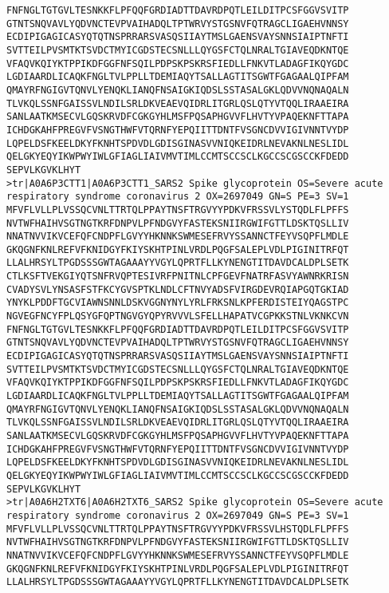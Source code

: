 \documentclass[en,black,12pt,normal]{elegantnote}
\begin{document}
\begin{lstlisting}
FNFNGLTGTGVLTESNKKFLPFQQFGRDIADTTDAVRDPQTLEILDITPCSFGGVSVITP
GTNTSNQVAVLYQDVNCTEVPVAIHADQLTPTWRVYSTGSNVFQTRAGCLIGAEHVNNSY
ECDIPIGAGICASYQTQTNSPRRARSVASQSIIAYTMSLGAENSVAYSNNSIAIPTNFTI
SVTTEILPVSMTKTSVDCTMYICGDSTECSNLLLQYGSFCTQLNRALTGIAVEQDKNTQE
VFAQVKQIYKTPPIKDFGGFNFSQILPDPSKPSKRSFIEDLLFNKVTLADAGFIKQYGDC
LGDIAARDLICAQKFNGLTVLPPLLTDEMIAQYTSALLAGTITSGWTFGAGAALQIPFAM
QMAYRFNGIGVTQNVLYENQKLIANQFNSAIGKIQDSLSSTASALGKLQDVVNQNAQALN
TLVKQLSSNFGAISSVLNDILSRLDKVEAEVQIDRLITGRLQSLQTYVTQQLIRAAEIRA
SANLAATKMSECVLGQSKRVDFCGKGYHLMSFPQSAPHGVVFLHVTYVPAQEKNFTTAPA
ICHDGKAHFPREGVFVSNGTHWFVTQRNFYEPQIITTDNTFVSGNCDVVIGIVNNTVYDP
LQPELDSFKEELDKYFKNHTSPDVDLGDISGINASVVNIQKEIDRLNEVAKNLNESLIDL
QELGKYEQYIKWPWYIWLGFIAGLIAIVMVTIMLCCMTSCCSCLKGCCSCGSCCKFDEDD
SEPVLKGVKLHYT
>tr|A0A6P3CTT1|A0A6P3CTT1_SARS2 Spike glycoprotein OS=Severe acute respiratory syndrome coronavirus 2 OX=2697049 GN=S PE=3 SV=1
MFVFLVLLPLVSSQCVNLTTRTQLPPAYTNSFTRGVYYPDKVFRSSVLYSTQDLFLPFFS
NVTWFHAIHVSGTNGTKRFDNPVLPFNDGVYFASTEKSNIIRGWIFGTTLDSKTQSLLIV
NNATNVVIKVCEFQFCNDPFLGVYYHKNNKSWMESEFRVYSSANNCTFEYVSQPFLMDLE
GKQGNFKNLREFVFKNIDGYFKIYSKHTPINLVRDLPQGFSALEPLVDLPIGINITRFQT
LLALHRSYLTPGDSSSGWTAGAAAYYVGYLQPRTFLLKYNENGTITDAVDCALDPLSETK
CTLKSFTVEKGIYQTSNFRVQPTESIVRFPNITNLCPFGEVFNATRFASVYAWNRKRISN
CVADYSVLYNSASFSTFKCYGVSPTKLNDLCFTNVYADSFVIRGDEVRQIAPGQTGKIAD
YNYKLPDDFTGCVIAWNSNNLDSKVGGNYNYLYRLFRKSNLKPFERDISTEIYQAGSTPC
NGVEGFNCYFPLQSYGFQPTNGVGYQPYRVVVLSFELLHAPATVCGPKKSTNLVKNKCVN
FNFNGLTGTGVLTESNKKFLPFQQFGRDIADTTDAVRDPQTLEILDITPCSFGGVSVITP
GTNTSNQVAVLYQDVNCTEVPVAIHADQLTPTWRVYSTGSNVFQTRAGCLIGAEHVNNSY
ECDIPIGAGICASYQTQTNSPRRARSVASQSIIAYTMSLGAENSVAYSNNSIAIPTNFTI
SVTTEILPVSMTKTSVDCTMYICGDSTECSNLLLQYGSFCTQLNRALTGIAVEQDKNTQE
VFAQVKQIYKTPPIKDFGGFNFSQILPDPSKPSKRSFIEDLLFNKVTLADAGFIKQYGDC
LGDIAARDLICAQKFNGLTVLPPLLTDEMIAQYTSALLAGTITSGWTFGAGAALQIPFAM
QMAYRFNGIGVTQNVLYENQKLIANQFNSAIGKIQDSLSSTASALGKLQDVVNQNAQALN
TLVKQLSSNFGAISSVLNDILSRLDKVEAEVQIDRLITGRLQSLQTYVTQQLIRAAEIRA
SANLAATKMSECVLGQSKRVDFCGKGYHLMSFPQSAPHGVVFLHVTYVPAQEKNFTTAPA
ICHDGKAHFPREGVFVSNGTHWFVTQRNFYEPQIITTDNTFVSGNCDVVIGIVNNTVYDP
LQPELDSFKEELDKYFKNHTSPDVDLGDISGINASVVNIQKEIDRLNEVAKNLNESLIDL
QELGKYEQYIKWPWYIWLGFIAGLIAIVMVTIMLCCMTSCCSCLKGCCSCGSCCKFDEDD
SEPVLKGVKLHYT
>tr|A0A6H2TXT6|A0A6H2TXT6_SARS2 Spike glycoprotein OS=Severe acute respiratory syndrome coronavirus 2 OX=2697049 GN=S PE=3 SV=1
MFVFLVLLPLVSSQCVNLTTRTQLPPAYTNSFTRGVYYPDKVFRSSVLHSTQDLFLPFFS
NVTWFHAIHVSGTNGTKRFDNPVLPFNDGVYFASTEKSNIIRGWIFGTTLDSKTQSLLIV
NNATNVVIKVCEFQFCNDPFLGVYYHKNNKSWMESEFRVYSSANNCTFEYVSQPFLMDLE
GKQGNFKNLREFVFKNIDGYFKIYSKHTPINLVRDLPQGFSALEPLVDLPIGINITRFQT
LLALHRSYLTPGDSSSGWTAGAAAYYVGYLQPRTFLLKYNENGTITDAVDCALDPLSETK

\end{lstlisting}
\end{document}
